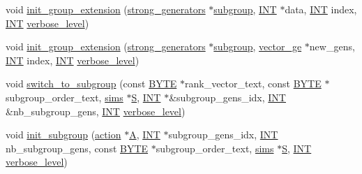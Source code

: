 \begin{DoxyCompactItemize}
\item 
void \mbox{\hyperlink{classstrong__generators_a5e889497cab5e9c522c8c4610ebb8328}{init\+\_\+group\+\_\+extension}} (\mbox{\hyperlink{classstrong__generators}{strong\+\_\+generators}} $\ast$\mbox{\hyperlink{classsubgroup}{subgroup}}, \mbox{\hyperlink{galois_8h_a09fddde158a3a20bd2dcadb609de11dc}{I\+NT}} $\ast$data, \mbox{\hyperlink{galois_8h_a09fddde158a3a20bd2dcadb609de11dc}{I\+NT}} index, \mbox{\hyperlink{galois_8h_a09fddde158a3a20bd2dcadb609de11dc}{I\+NT}} \mbox{\hyperlink{simeon_8_c_a818073fbcc2f439e7c56952f67386122}{verbose\+\_\+level}})
\item 
void \mbox{\hyperlink{classstrong__generators_aacee10b325c9b3ee4af1805a1b62044c}{init\+\_\+group\+\_\+extension}} (\mbox{\hyperlink{classstrong__generators}{strong\+\_\+generators}} $\ast$\mbox{\hyperlink{classsubgroup}{subgroup}}, \mbox{\hyperlink{classvector__ge}{vector\+\_\+ge}} $\ast$new\+\_\+gens, \mbox{\hyperlink{galois_8h_a09fddde158a3a20bd2dcadb609de11dc}{I\+NT}} index, \mbox{\hyperlink{galois_8h_a09fddde158a3a20bd2dcadb609de11dc}{I\+NT}} \mbox{\hyperlink{simeon_8_c_a818073fbcc2f439e7c56952f67386122}{verbose\+\_\+level}})
\item 
void \mbox{\hyperlink{classstrong__generators_ac08fd2bdfc8603376339c9590e43bdfb}{switch\+\_\+to\+\_\+subgroup}} (const \mbox{\hyperlink{galois_8h_ab6cc7b4aeb6ea31aba2b3fbfc83ff5e6}{B\+Y\+TE}} $\ast$rank\+\_\+vector\+\_\+text, const \mbox{\hyperlink{galois_8h_ab6cc7b4aeb6ea31aba2b3fbfc83ff5e6}{B\+Y\+TE}} $\ast$subgroup\+\_\+order\+\_\+text, \mbox{\hyperlink{classsims}{sims}} $\ast$\mbox{\hyperlink{simeon_8_c_adab47f8243f1b5a2c31df2535d6b37d0}{S}}, \mbox{\hyperlink{galois_8h_a09fddde158a3a20bd2dcadb609de11dc}{I\+NT}} $\ast$\&subgroup\+\_\+gens\+\_\+idx, \mbox{\hyperlink{galois_8h_a09fddde158a3a20bd2dcadb609de11dc}{I\+NT}} \&nb\+\_\+subgroup\+\_\+gens, \mbox{\hyperlink{galois_8h_a09fddde158a3a20bd2dcadb609de11dc}{I\+NT}} \mbox{\hyperlink{simeon_8_c_a818073fbcc2f439e7c56952f67386122}{verbose\+\_\+level}})
\item 
void \mbox{\hyperlink{classstrong__generators_ae6e516c1240181e1ea5e1968c2073b0f}{init\+\_\+subgroup}} (\mbox{\hyperlink{classaction}{action}} $\ast$\mbox{\hyperlink{classstrong__generators_af0347a92942f8996e71d97b9a8df5069}{A}}, \mbox{\hyperlink{galois_8h_a09fddde158a3a20bd2dcadb609de11dc}{I\+NT}} $\ast$subgroup\+\_\+gens\+\_\+idx, \mbox{\hyperlink{galois_8h_a09fddde158a3a20bd2dcadb609de11dc}{I\+NT}} nb\+\_\+subgroup\+\_\+gens, const \mbox{\hyperlink{galois_8h_ab6cc7b4aeb6ea31aba2b3fbfc83ff5e6}{B\+Y\+TE}} $\ast$subgroup\+\_\+order\+\_\+text, \mbox{\hyperlink{classsims}{sims}} $\ast$\mbox{\hyperlink{simeon_8_c_adab47f8243f1b5a2c31df2535d6b37d0}{S}}, \mbox{\hyperlink{galois_8h_a09fddde158a3a20bd2dcadb609de11dc}{I\+NT}} \mbox{\hyperlink{simeon_8_c_a818073fbcc2f439e7c56952f67386122}{verbose\+\_\+level}})

\end{DoxyCompactItemize}
